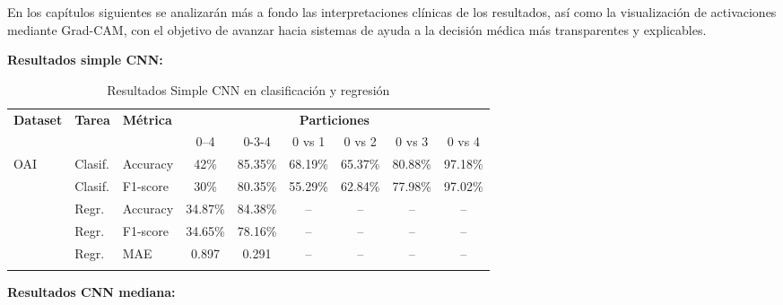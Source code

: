 En los capítulos siguientes se analizarán más a fondo las interpretaciones clínicas de los resultados, así como la visualización de activaciones mediante Grad-CAM, con el objetivo de avanzar hacia sistemas de ayuda a la decisión médica más transparentes y explicables.

\textbf{Resultados simple CNN:}

\begin{table}[h]
    \centering
    \caption{Resultados Simple CNN en clasificación y regresión}
    \label{tab:simple_cnn_results_improved}
    \begin{tabular}{@{} l l l c c c c c c @{}} 
      \toprule
      \textbf{Dataset} & \textbf{Tarea} & \textbf{Métrica} 
        & \multicolumn{6}{c}{\textbf{Particiones}} \\
      \cmidrule(lr){4-9}
      & & & 0--4 & 0-3-4 & 0 vs 1 & 0 vs 2 & 0 vs 3 & 0 vs 4 \\
      \midrule
      \multirow{2}{*}{OAI}
        & Clasif. & Accuracy   & 42\%   & 85.35\%   & 68.19\% &  65.37\%   &  80.88\%   &  97.18\%   \\
        & Clasif. & F1-score    & 30\%  & 80.35\%  & 55.29\%  &  62.84\%   &  77.98\%   &  97.02\%   \\
      \addlinespace
      \multirow{3}{*}{OAI}
        & Regr.   & Accuracy   & 34.87\%   & 84.38\% &  --      &  --   &  --   &  --   \\
        & Regr.   & F1-score    & 34.65\%  & 78.16\%  &  --      &  --   &  --   &  --   \\
        & Regr.   & MAE         & 0.897  & 0.291  &  --      &  --   &  --   &  --   \\
      \addlinespace
    \end{tabular}
\end{table}
  


\textbf{Resultados CNN mediana:}

